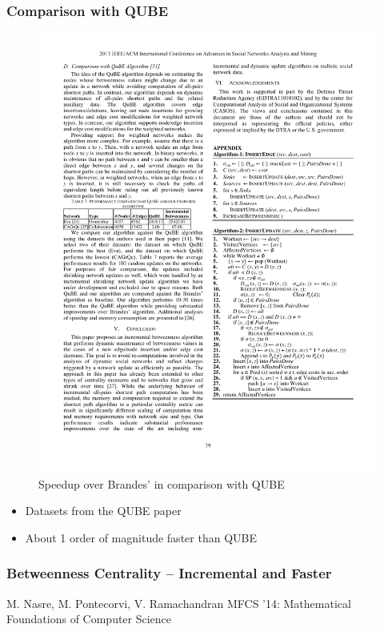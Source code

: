 \begin{frame}
  \frametitle{Comparison with QUBE}

  \begin{figure}[t]
    \centering
    \includegraphics[width=\textwidth, height=0.7\textheight, keepaspectratio]{imgs/kas-results2}
    \caption{Speedup over Brandes' in comparison with QUBE}
  \end{figure}

  \begin{itemize}
    \item Datasets from the QUBE paper
    \item About 1 order of magnitude faster than QUBE
  \end{itemize}
    
\end{frame}


\begin{frame}
  \frametitle{Betweenness Centrality -- Incremental and Faster}
  \centering
  \vfill
  {\huge M. Nasre, M. Pontecorvi, V. Ramachandran}
  \vfill
  {\large MFCS '14: Mathematical Foundations of Computer Science}
\end{frame}


